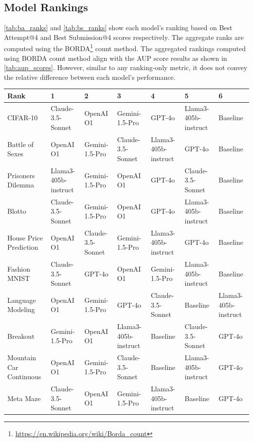 \documentclass[]{fairmeta}
\begin{document}
\subsection{Model Rankings}
\label{sec:raw_results_appendix}

\autoref{tab:ba_ranks} and \autoref{tab:bs_ranks} show each model's ranking based on Best Attempt@4 and Best Submission@4 scores respectively. The aggregate ranks are computed using the BORDA\footnote{\url{https://en.wikipedia.org/wiki/Borda_count}} count method.
The aggregated rankings computed using BORDA count method align with the AUP score results as shown in \autoref{tab:aup_scores}. However, similar to any ranking-only metric, it does not convey the relative difference between each model's performance.

\begin{table}[!htb]
    \centering
    \begin{adjustbox}{width=\textwidth}
    \begin{NiceTabular}{lllllll}
        \toprule
        Rank & 1 & 2 & 3 & 4 & 5 & 6 \\
        \midrule
        CIFAR-10 & Claude-3.5-Sonnet & OpenAI O1 & Gemini-1.5-Pro & GPT-4o & Llama3-405b-instruct & Baseline \\
        Battle of Sexes & OpenAI O1 & Gemini-1.5-Pro & Claude-3.5-Sonnet & Llama3-405b-instruct & GPT-4o & Baseline \\
        Prisoners Dilemma & Llama3-405b-instruct & Gemini-1.5-Pro & OpenAI O1 & GPT-4o & Claude-3.5-Sonnet & Baseline \\
        Blotto & Claude-3.5-Sonnet & Gemini-1.5-Pro & OpenAI O1 & GPT-4o & Llama3-405b-instruct & Baseline \\
        House Price Prediction & OpenAI O1 & Claude-3.5-Sonnet & Gemini-1.5-Pro & Llama3-405b-instruct & GPT-4o & Baseline \\
        Fashion MNIST & Claude-3.5-Sonnet & GPT-4o & OpenAI O1 & Gemini-1.5-Pro & Llama3-405b-instruct & Baseline \\
        Language Modeling & OpenAI O1 & Gemini-1.5-Pro & GPT-4o & Claude-3.5-Sonnet & Baseline & Llama3-405b-instruct \\
        Breakout & Gemini-1.5-Pro & OpenAI O1 & Llama3-405b-instruct & Baseline & Claude-3.5-Sonnet & GPT-4o \\
        Mountain Car Continuous & OpenAI O1 & Gemini-1.5-Pro & Claude-3.5-Sonnet & Baseline & Llama3-405b-instruct & GPT-4o \\
        Meta Maze & Claude-3.5-Sonnet & OpenAI O1 & Gemini-1.5-Pro & Llama3-405b-instruct & Baseline & GPT-4o \\

\end{NiceTabular}
\end{adjustbox}
\end{table}
\end{document}
